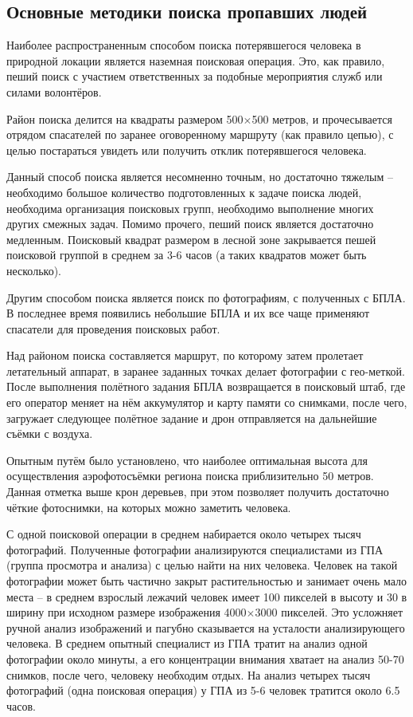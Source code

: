 \subsection{Основные методики поиска пропавших людей}

Наиболее распространенным способом поиска потерявшегося человека в природной локации является наземная поисковая операция. Это, как правило, пеший поиск с участием ответственных за подобные мероприятия служб или силами волонтёров. 

Район поиска делится на квадраты размером 500$\times$500 метров, и прочесывается отрядом спасателей по заранее оговоренному маршруту (как правило цепью), с целью постараться увидеть или получить отклик потерявшегося человека. 

Данный способ поиска является несомненно точным, но достаточно тяжелым -- необходимо большое количество подготовленных к задаче поиска людей, необходима организация поисковых групп, необходимо выполнение многих других смежных задач. Помимо прочего, пеший поиск является достаточно медленным. Поисковый квадрат размером в лесной зоне закрывается пешей поисковой группой в среднем за 3-6 часов (а таких квадратов может быть несколько).

Другим способом поиска является поиск по фотографиям, с полученных с БПЛА. В последнее время появились небольшие БПЛА и их все чаще применяют спасатели для проведения поисковых работ. 

Над районом поиска составляется маршрут, по которому затем пролетает летательный аппарат, в заранее заданных точках делает фотографии с гео-меткой. После выполнения полётного задания БПЛА возвращается в поисковый штаб, где его оператор меняет на нём аккумулятор и карту памяти со снимками, после чего, загружает следующее полётное задание и дрон отправляется на дальнейшие съёмки с воздуха.

Опытным путём было установлено, что наиболее оптимальная высота для осуществления аэрофотосъёмки региона поиска приблизительно 50 метров. Данная отметка выше крон деревьев, при этом позволяет получить достаточно чёткие фотоснимки, на которых можно заметить человека.

С одной поисковой операции в среднем набирается около четырех тысяч фотографий. Полученные фотографии анализируются специалистами из ГПА (группа просмотра и анализа) с целью найти на них человека. Человек на такой фотографии может быть частично закрыт растительностью и занимает очень мало места -- в среднем взрослый лежачий человек имеет 100 пикселей в высоту и 30 в ширину при исходном размере изображения 4000$\times$3000 пикселей. Это усложняет ручной анализ изображений и пагубно сказывается на усталости анализирующего человека. В среднем опытный специалист из ГПА тратит на анализ одной фотографии около минуты, а его концентрации внимания хватает на анализ 50-70 снимков, после чего, человеку необходим отдых. На анализ четырех тысяч фотографий (одна поисковая операция) у ГПА из 5-6 человек тратится около 6.5 часов.